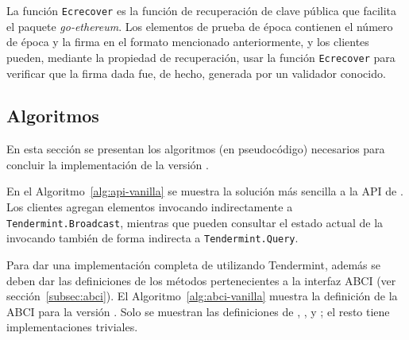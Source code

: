 
La función \texttt{Ecrecover} es la función de recuperación de clave pública que facilita el paquete \textit{go-ethereum}.
%
Los elementos de prueba de época contienen el número de
época y la firma en el formato mencionado anteriormente, y los clientes pueden, mediante la propiedad de recuperación,
usar la función \texttt{Ecrecover} para
verificar que la firma dada fue, de hecho, generada por un validador conocido.
%


\subsection{Algoritmos}

En esta sección se presentan los algoritmos (en pseudocódigo) necesarios para concluir
la implementación de la versión \vanilla.
%


En el Algoritmo~\ref{alg:api-vanilla} se muestra la solución más sencilla a la API
de \setchain.
%
Los clientes agregan elementos invocando indirectamente a
\texttt{Tendermint.Broadcast}, mientras que pueden consultar el estado actual de
la \setchain invocando también de forma indirecta a \texttt{Tendermint.Query}.
%

Para dar una implementación completa de \setchain utilizando Tendermint, además se
deben dar las definiciones de los métodos pertenecientes a la interfaz ABCI
(ver sección~\ref{subsec:abci}). 
%
El Algoritmo~\ref{alg:abci-vanilla} muestra la definición de la ABCI para la versión
\vanilla.
%
Solo se muestran las definiciones de \CheckTx, \DeliverTx, \EndBlock y \Query;
el resto tiene implementaciones triviales.

